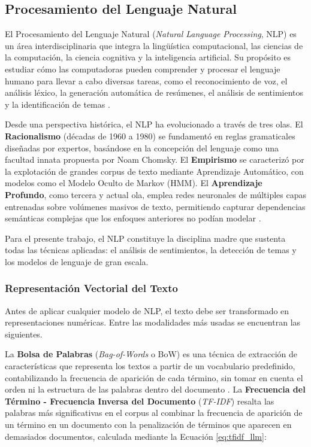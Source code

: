 \documentclass[listof=nochaptergap,12pt,times,authoryear]{report}
\begin{document}
\subsection{Procesamiento del Lenguaje Natural}
 
El Procesamiento del Lenguaje Natural (\textit{Natural Language Processing}, NLP) es un área interdisciplinaria que integra la lingüística computacional, las ciencias de la computación, la ciencia cognitiva y la inteligencia artificial. Su propósito es estudiar cómo las computadoras pueden comprender y procesar el lenguaje humano para llevar a cabo diversas tareas, como el reconocimiento de voz, el análisis léxico, la generación automática de resúmenes, el análisis de sentimientos y la identificación de temas \parencite{bk_deng2018deeplearningnlp}.
 
Desde una perspectiva histórica, el NLP ha evolucionado a través de tres olas. El \textbf{Racionalismo} (décadas de 1960 a 1980) se fundamentó en reglas gramaticales diseñadas por expertos, basándose en la concepción del lenguaje como una facultad innata propuesta por Noam Chomsky. El \textbf{Empirismo} se caracterizó por la explotación de grandes corpus de texto mediante Aprendizaje Automático, con modelos como el Modelo Oculto de Markov (HMM). El \textbf{Aprendizaje Profundo}, como tercera y actual ola, emplea redes neuronales de múltiples capas entrenadas sobre volúmenes masivos de texto, permitiendo capturar dependencias semánticas complejas que los enfoques anteriores no podían modelar \parencite{bk_deng2018deeplearningnlp}.
 
Para el presente trabajo, el NLP constituye la disciplina madre que sustenta todas las técnicas aplicadas: el análisis de sentimientos, la detección de temas y los modelos de lenguaje de gran escala.
 
\subsubsection{Representación Vectorial del Texto}
 
Antes de aplicar cualquier modelo de NLP, el texto debe ser transformado en representaciones numéricas. Entre las modalidades más usadas se encuentran las siguientes.
 
La \textbf{Bolsa de Palabras} (\textit{Bag-of-Words} o BoW) es una técnica de extracción de características que representa los textos a partir de un vocabulario predefinido, contabilizando la frecuencia de aparición de cada término, sin tomar en cuenta el orden ni la estructura de las palabras dentro del documento \parencite{bk_brownlee2017deeplearning_nlp}. La \textbf{Frecuencia del Término - Frecuencia Inversa del Documento} (\textit{TF-IDF}) resalta las palabras más significativas en el corpus al combinar la frecuencia de aparición de un término en un documento con la penalización de términos que aparecen en demasiados documentos, calculada mediante la Ecuación \ref{eq:tfidf_llm}:
 
\end{document}
